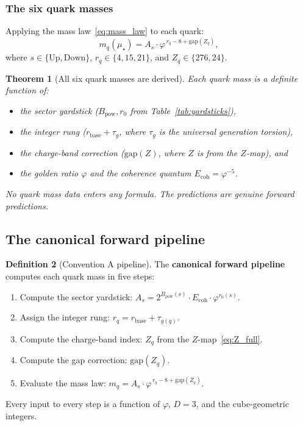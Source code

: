\documentclass[11pt,a4paper]{article}
\newtheorem{theorem}{Theorem}[section]
\theoremstyle{definition}
\newtheorem{definition}[theorem]{Definition}
\theoremstyle{remark}
\newcommand{\phig}{\varphi}
\newcommand{\Ecoh}{E_{\mathrm{coh}}}
\newcommand{\muStar}{\mu_{\star}}
\newcommand{\Zidx}{Z}
\begin{document}
\subsubsection{The six quark masses}

Applying the mass law~\eqref{eq:mass_law} to each quark:
\begin{equation}
  m_q(\muStar) = A_s \cdot \phig^{\,r_q - 8 + \mathrm{gap}(\Zidx_q)},
  \label{eq:quark_mass}
\end{equation}
where $s \in \{\text{Up}, \text{Down}\}$, $r_q \in \{4, 15, 21\}$, and
$\Zidx_q \in \{276, 24\}$.

\begin{theorem}[All six quark masses are derived]
\label{thm:quark_masses}
Each quark mass is a definite function of:
\begin{itemize}[nosep]
  \item the sector yardstick ($B_{\mathrm{pow}}, r_0$ from
        Table~\ref{tab:yardsticks}),
  \item the integer rung ($r_{\mathrm{base}} + \tau_g$, where $\tau_g$ is
        the universal generation torsion),
  \item the charge-band correction ($\mathrm{gap}(\Zidx)$, where $\Zidx$ is
        from the $\Zidx$-map), and
  \item the golden ratio $\phig$ and the coherence quantum $\Ecoh = \phig^{-5}$.
\end{itemize}
No quark mass data enters any formula.  The predictions are genuine forward
predictions.
\end{theorem}

\subsection{The canonical forward pipeline}

\begin{definition}[Convention A pipeline]
\label{def:convention_A}
The \textbf{canonical forward pipeline} computes each quark mass in five
steps:
\begin{enumerate}[nosep]
  \item Compute the sector yardstick:
        $A_s = 2^{B_{\mathrm{pow}}(s)} \cdot \Ecoh \cdot \phig^{r_0(s)}$.
  \item Assign the integer rung: $r_q = r_{\mathrm{base}} + \tau_{g(q)}$.
  \item Compute the charge-band index: $\Zidx_q$ from
        the $\Zidx$-map~\eqref{eq:Z_full}.
  \item Compute the gap correction: $\mathrm{gap}(\Zidx_q)$.
  \item Evaluate the mass law: $m_q = A_s \cdot \phig^{\,r_q - 8 +
        \mathrm{gap}(\Zidx_q)}$.
\end{enumerate}
Every input to every step is a function of $\phig$, $D = 3$, and the
cube-geometric integers.
\end{definition}
\end{document}

